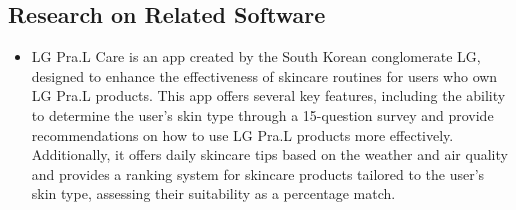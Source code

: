 \documentclass[conference]{IEEEtran}
\begin{document}
\subsection{Research on Related Software}\label{SCM}
\begin{itemize}
A. LG Pra.L Care
\begin{figure} [h]
    \texttt{[image: fig/PraL2.png]}
    \caption{LG Pra.L Care}
\end{figure}
\\
\item LG Pra.L Care is an app created by the South Korean conglomerate LG, designed to enhance the effectiveness of skincare routines for users who own LG Pra.L products. This app offers several key features, including the ability to determine the user's skin type through a 15-question survey and provide recommendations on how to use LG Pra.L products more effectively. Additionally, it offers daily skincare tips based on the weather and air quality and provides a ranking system for skincare products tailored to the user's skin type, assessing their suitability as a percentage match.
\\
\\


\end{itemize}
\end{document}
